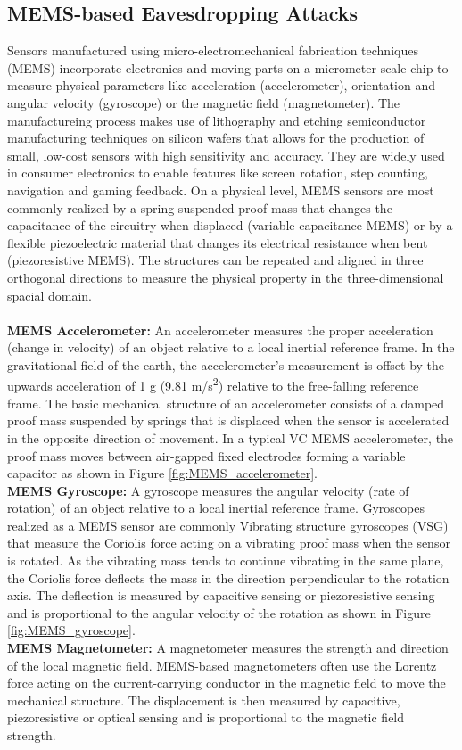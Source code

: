 \documentclass[sigconf, nonacm]{acmart}
\begin{document}
\subsection{MEMS-based Eavesdropping Attacks}

Sensors manufactured using micro-electromechanical fabrication techniques (MEMS) incorporate electronics and moving parts on a micrometer-scale chip to measure physical parameters like acceleration (accelerometer), orientation and angular velocity (gyroscope) or the magnetic field (magnetometer).
The manufactureing process makes use of lithography and etching semiconductor manufacturing techniques on silicon wafers that allows for the production of small, low-cost sensors with high sensitivity and accuracy.
They are widely used in consumer electronics to enable features like screen rotation, step counting, navigation and gaming feedback.
On a physical level, MEMS sensors are most commonly realized by a spring-suspended proof mass that changes the capacitance of the circuitry when displaced (variable capacitance MEMS) or by a flexible piezoelectric material that changes its electrical resistance when bent (piezoresistive MEMS).
The structures can be repeated and aligned in three orthogonal directions to measure the physical property in the three-dimensional spacial domain.
\\~\\
\textbf{MEMS Accelerometer:} An accelerometer measures the proper acceleration (change in velocity) of an object relative to a local inertial reference frame.
In the gravitational field of the earth, the accelerometer's measurement is offset by the upwards acceleration of 1 g (9.81 m/s\textsuperscript{2}) relative to the free-falling reference frame.
The basic mechanical structure of an accelerometer consists of a damped proof mass suspended by springs that is displaced when the sensor is accelerated in the opposite direction of movement.
In a typical VC MEMS accelerometer, the proof mass moves between air-gapped fixed electrodes forming a variable capacitor as shown in Figure \ref{fig:MEMS_accelerometer}.
\\[6pt]
\textbf{MEMS Gyroscope:} A gyroscope measures the angular velocity (rate of rotation) of an object relative to a local inertial reference frame.
Gyroscopes realized as a MEMS sensor are commonly Vibrating structure gyroscopes (VSG) that measure the Coriolis force acting on a vibrating proof mass when the sensor is rotated.
As the vibrating mass tends to continue vibrating in the same plane, the Coriolis force deflects the mass in the direction perpendicular to the rotation axis.
The deflection is measured by capacitive sensing or piezoresistive sensing and is proportional to the angular velocity of the rotation as shown in Figure \ref{fig:MEMS_gyroscope}.
\\[6pt]
\textbf{MEMS Magnetometer:} A magnetometer measures the strength and direction of the local magnetic field.
MEMS-based magnetometers often use the Lorentz force acting on the current-carrying conductor in the magnetic field to move the mechanical structure.
The displacement is then measured by capacitive, piezoresistive or optical sensing and is proportional to the magnetic field strength.
\end{document}
